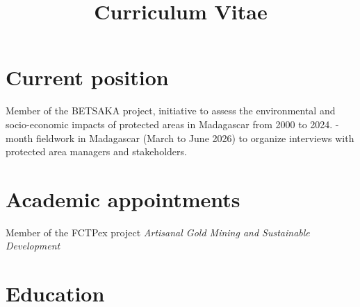 \documentclass[11pt,a4paper,sans]{moderncv} %
\title{Curriculum Vitae}
\begin{document}
\makecvtitle %




\section{Current position}

{
Member of the BETSAKA project, initiative to assess the environmental and socio-economic impacts of protected areas in Madagascar from 2000 to 2024. -month fieldwork in Madagascar (March to June 2026) to organize interviews with protected area managers and stakeholders.
}

\section{Academic appointments}

{\newline Member of the FCTPex project \textit{Artisanal Gold Mining and Sustainable Development}}{}

\section{Education}
\end{document}
